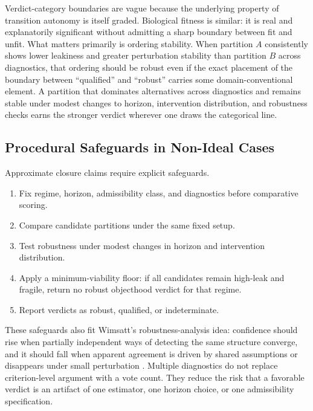 Verdict-category boundaries are vague because the underlying property
of transition autonomy is itself graded. Biological fitness is similar:
it is real and explanatorily significant without admitting a sharp
boundary between fit and unfit. What matters primarily is ordering
stability. When partition
$A$ consistently shows lower leakiness and greater perturbation
stability than partition $B$ across diagnostics, that ordering should be
robust even if the exact placement of the boundary between ``qualified''
and ``robust'' carries some domain-conventional element. A partition
that dominates alternatives across diagnostics and remains stable under
modest changes to horizon, intervention distribution, and robustness
checks earns the stronger verdict wherever one draws the
categorical line.

\subsection{Procedural Safeguards in Non-Ideal
	Cases}\label{procedural-safeguards-in-non-ideal-cases}

Approximate closure claims require explicit safeguards.

\begin{enumerate}
	\item
	      Fix regime, horizon, admissibility class, and diagnostics before
	      comparative scoring.
	\item
	      Compare candidate partitions under the same fixed setup.
	\item
	      Test robustness under modest changes in horizon and intervention
	      distribution.
	\item
	      Apply a minimum-viability floor: if all candidates remain high-leak
	      and fragile, return no robust objecthood verdict for that regime.
	\item
	      Report verdicts as robust, qualified, or indeterminate.
\end{enumerate}

These safeguards also fit Wimsatt's robustness-analysis idea:
confidence should rise when partially independent ways of detecting the
same structure converge, and it should fall when apparent agreement is
driven by shared assumptions or disappears under small perturbation
\citep{wimsatt1981}. Multiple diagnostics do not replace criterion-level
argument with a vote count. They reduce the risk that a favorable verdict
is an artifact of one estimator, one horizon choice, or one admissibility
specification.

